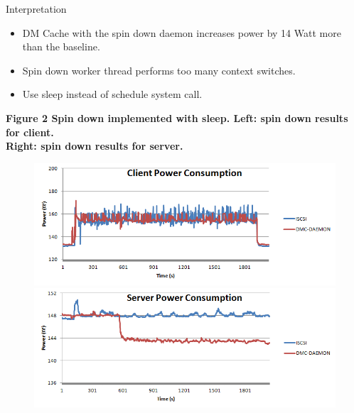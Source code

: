 \documentclass{beamer}
\begin{document}
\begin{frame}
    \begin{block}{Interpretation}
	\begin{itemize}
	    \item DM Cache with the spin down daemon increases power
		by 14 Watt more than the baseline.
	    \item Spin down worker thread performs too many context switches.
	    \item Use sleep instead of schedule system call.
	\end{itemize}
    \end{block}
    
    \raggedright \bf Figure 2 \rm Spin down implemented with sleep.
    Left: spin down results for client. \\
    Right: spin down results for server.
    \begin{figure}
	\vspace{5pt}
	\centering \includegraphics[scale=.31]{image2.png}
	\centering \includegraphics[scale=.31]{image3.png}
	\label{fig:results2}
    \end{figure}
    
\end{frame}

%
\end{document}
